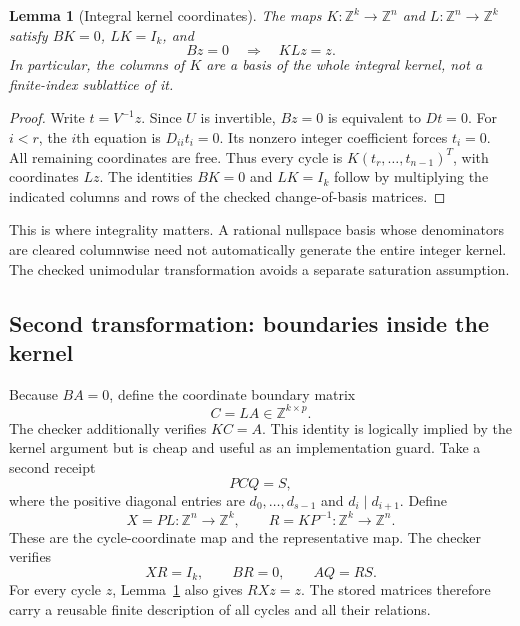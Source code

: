 \documentclass[11pt,letterpaper]{article}
\newtheorem{lemma}[theorem]{Lemma}
\theoremstyle{definition}\newtheorem{definition}[theorem]{Definition}
\theoremstyle{remark}\newtheorem{remark}[theorem]{Remark}
\newcommand{\Z}{\mathbb Z}\newcommand{\Q}{\mathbb Q}
\begin{document}
\begin{lemma}[Integral kernel coordinates]\label{lem:kernel}
The maps $K:\Z^k\to\Z^n$ and $L:\Z^n\to\Z^k$ satisfy
$BK=0$, $LK=I_k$, and
\[
 Bz=0\quad\Longrightarrow\quad KLz=z.
\]
In particular, the columns of $K$ are a basis of the \emph{whole} integral
kernel, not a finite-index sublattice of it.
\end{lemma}
\begin{proof}
Write $t=V^{-1}z$. Since $U$ is invertible, $Bz=0$ is equivalent to $Dt=0$.
For $i<r$, the $i$th equation is $D_{ii}t_i=0$. Its nonzero integer coefficient
forces $t_i=0$. All remaining coordinates are free. Thus every cycle is
$K(t_r,\ldots,t_{n-1})^T$, with coordinates $Lz$. The identities $BK=0$ and
$LK=I_k$ follow by multiplying the indicated columns and rows of the checked
change-of-basis matrices.
\end{proof}

This is where integrality matters. A rational nullspace basis whose denominators
are cleared columnwise need not automatically generate the entire integer
kernel. The checked unimodular transformation avoids a separate saturation
assumption.

\subsection{Second transformation: boundaries inside the kernel}
Because $BA=0$, define the coordinate boundary matrix
\[
 C=LA\in\Z^{k\times p}.
\]
The checker additionally verifies $KC=A$. This identity is logically implied
by the kernel argument but is cheap and useful as an implementation guard.
Take a second receipt
\[
 PCQ=S,
\]
where the positive diagonal entries are $d_0,\ldots,d_{s-1}$ and
$d_i\mid d_{i+1}$. Define
\begin{equation}\label{eq:XR}
 X=PL:\Z^n\to\Z^k,\qquad R=KP^{-1}:\Z^k\to\Z^n.
\end{equation}
These are the cycle-coordinate map and the representative map. The checker
verifies
\begin{equation}\label{eq:coordinate-identities}
 XR=I_k,\qquad BR=0,\qquad AQ=RS.
\end{equation}
For every cycle $z$, Lemma~\ref{lem:kernel} also gives $RXz=z$.
The stored matrices therefore carry a reusable finite description of all cycles
and all their relations.
\end{document}
